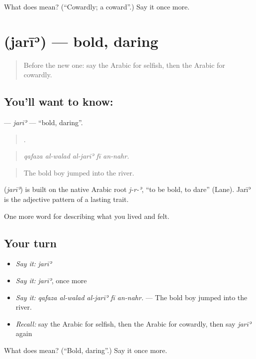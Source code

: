 \begin{tcolorbox}[breakable,colback=teal!4,colframe=teal!35!black,title={Before you move on}]
What does  mean? (\textquotedblleft{}Cowardly; a coward\textquotedblright{}.) Say it once more.
\end{tcolorbox}
\section[\texorpdfstring{\ar{جريء} (jarīʾ)}{جريء (jarīʾ)}]{ (jarīʾ) — bold, daring}

\label{lesson:AR-C500-jari}



\begin{quote}
Before the new one: say the Arabic for selfish, then the Arabic for cowardly.
\end{quote}

\subsection*{You'll want to know: }
\textbf{} — \emph{jarīʾ} — \textquotedblleft{}bold, daring\textquotedblright{}.

\begin{quote}
    .
\end{quote}

\begin{quote}
\emph{qafaza al-walad al-jarīʾ fī an-nahr.}
\end{quote}

\begin{quote}
The bold boy jumped into the river.
\end{quote}

\begin{cousinweb}
\textbf{} (\emph{jarīʾ}) is built on the native Arabic root \emph{j-r-ʾ}, \textquotedblleft{}to be bold, to dare\textquotedblright{} (Lane). Jarīʾ is the adjective pattern of a lasting trait.
\end{cousinweb}

\begin{grammarlens}[title={What you've built}]
One more word for describing what you lived and felt.
\end{grammarlens}

\subsection*{Your turn}
\begin{itemize}
\raggedright
  \item \emph{Say it:} \emph{jarīʾ}
  \item \emph{Say it:} \emph{jarīʾ}, once more
  \item \emph{Say it:} \emph{qafaza al-walad al-jarīʾ fī an-nahr.} — The bold boy jumped into the river.
  \item \emph{Recall:} say the Arabic for selfish, then the Arabic for cowardly, then say \emph{jarīʾ} again
\end{itemize}

\begin{tcolorbox}[breakable,colback=teal!4,colframe=teal!35!black,title={Before you move on}]
What does  mean? (\textquotedblleft{}Bold, daring\textquotedblright{}.) Say it once more.
\end{tcolorbox}
